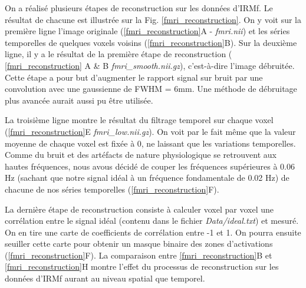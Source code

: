 \documentclass[a4paper]{article}
\begin{document}
On a réalisé plusieurs étapes de reconstruction sur les données d'IRMf. Le résultat de chacune est illustrée sur la Fig. \ref{fmri_reconstruction}. On y voit sur la première ligne l'image originale (\ref{fmri_reconstruction}A - \emph{fmri.nii}) et les séries temporelles de quelques voxels voisins (\ref{fmri_reconstruction}B). Sur la deuxième ligne, il y a le résultat de la première étape de reconstruction ( \ref{fmri_reconstruction} A \& B \emph{fmri\_smooth.nii.gz}), c'est-à-dire l'image débruitée. Cette étape a pour but d'augmenter le rapport signal sur bruit par une convolution avec une gaussienne de FWHM = 6mm. Une méthode de débruitage plus avancée aurait aussi pu être utilisée.

La troisième ligne montre le résultat du filtrage temporel sur chaque voxel (\ref{fmri_reconstruction}E \emph{fmri\_low.nii.gz}). On voit par le fait même que la valeur moyenne de chaque voxel est fixée à 0, ne laissant que les variations temporelles. Comme du bruit et des artéfacts de nature physiologique se retrouvent aux hautes fréquences, nous avous décidé de couper les fréquences supérieures à 0.06 Hz (sachant que notre signal idéal à un fréquence fondamentale de 0.02 Hz) de chacune de nos séries temporelles (\ref{fmri_reconstruction}F).

La dernière étape de reconstruction consiste à calculer voxel par voxel une corrélation entre le signal idéal (contenu dans le fichier \emph{Data/ideal.txt}) et mesuré.  On en tire une carte de coefficients de corrélation entre -1 et 1. On pourra ensuite seuiller cette carte pour obtenir un masque binaire des zones d'activations (\ref{fmri_reconstruction}F). La comparaison entre \ref{fmri_reconstruction}B et \ref{fmri_reconstruction}H montre l'effet du processus de reconstruction sur les données d'IRMf aurant au niveau spatial que temporel.
\end{document}
